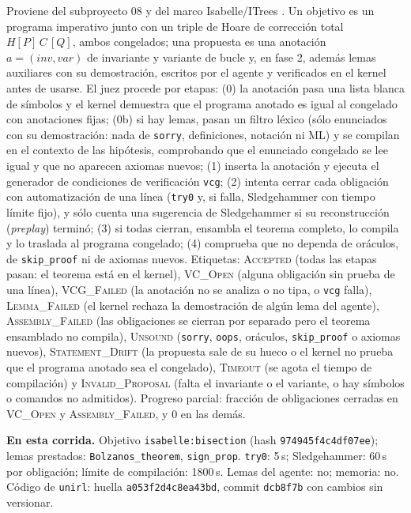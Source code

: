 \documentclass[11pt,a4paper]{article}
\begin{document}
Proviene del subproyecto 08 y del marco Isabelle/ITrees \citep{BryantHuertaFoster2026}. Un objetivo es un programa imperativo junto con un triple de Hoare de corrección total $H[P]\,C\,[Q]$, ambos congelados; una propuesta es una anotación $a = (\mathit{inv}, \mathit{var})$ de invariante y variante de bucle y, en fase 2, además lemas auxiliares con su demostración, escritos por el agente y verificados en el kernel antes de usarse. El juez procede por etapas: (0) la anotación pasa una lista blanca de símbolos y el kernel demuestra que el programa anotado es igual al congelado con anotaciones fijas; (0b) si hay lemas, pasan un filtro léxico (sólo enunciados con su demostración: nada de \texttt{sorry}, definiciones, notación ni ML) y se compilan en el contexto de las hipótesis, comprobando que el enunciado congelado se lee igual y que no aparecen axiomas nuevos; (1) inserta la anotación y ejecuta el generador de condiciones de verificación \texttt{vcg}; (2) intenta cerrar cada obligación con automatización de una línea (\texttt{try0} y, si falla, Sledgehammer con tiempo límite fijo), y sólo cuenta una sugerencia de Sledgehammer si su reconstrucción (\emph{preplay}) terminó; (3) si todas cierran, ensambla el teorema completo, lo compila y lo traslada al programa congelado; (4) comprueba que no dependa de oráculos, de \texttt{skip\_proof} ni de axiomas nuevos. Etiquetas: \textsc{Accepted} (todas las etapas pasan: el teorema está en el kernel), \textsc{VC\_Open} (alguna obligación sin prueba de una línea), \textsc{VCG\_Failed} (la anotación no se analiza o no tipa, o \texttt{vcg} falla), \textsc{Lemma\_Failed} (el kernel rechaza la demostración de algún lema del agente), \textsc{Assembly\_Failed} (las obligaciones se cierran por separado pero el teorema ensamblado no compila), \textsc{Unsound} (\texttt{sorry}, \texttt{oops}, oráculos, \texttt{skip\_proof} o axiomas nuevos), \textsc{Statement\_Drift} (la propuesta sale de su hueco o el kernel no prueba que el programa anotado sea el congelado), \textsc{Timeout} (se agota el tiempo de compilación) y \textsc{Invalid\_Proposal} (falta el invariante o el variante, o hay símbolos o comandos no admitidos). Progreso parcial: fracción de obligaciones cerradas en \textsc{VC\_Open} y \textsc{Assembly\_Failed}, y $0$ en las demás.

\textbf{En esta corrida.} Objetivo \texttt{isabelle:\allowbreak{}bisection} (hash \texttt{974945f4c4df07ee}); lemas prestados: \texttt{Bolzanos\_\allowbreak{}theorem}, \texttt{sign\_\allowbreak{}prop}. \texttt{try0}: 5\,s; Sledgehammer: 60\,s por obligación; límite de compilación: 1800\,s. Lemas del agente: no; memoria: no. Código de \texttt{unirl}: huella \texttt{a053f2d4c8ea43bd}, commit \texttt{dcb8f7b} con cambios sin versionar.
\end{document}
